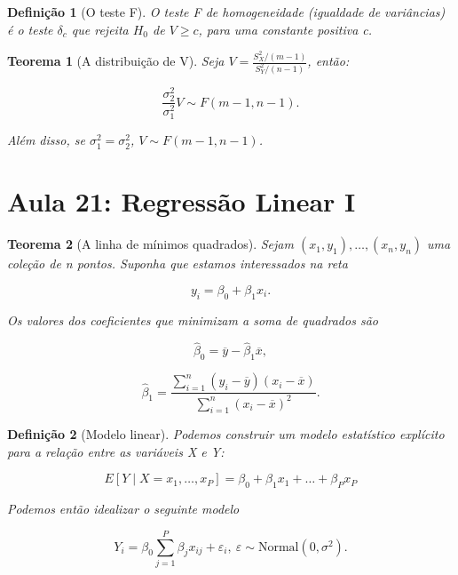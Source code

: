 \documentclass{article}
\newtheorem{theorem}{Teorema}
\newtheorem{definition}{Definição}
\begin{document}
\begin{definition}[O teste F]
O teste F de homogeneidade (igualdade de variâncias) é o teste $\delta_c$ que rejeita $H_0$ de $V \geq c$, para uma constante positiva c.
\end{definition}

\begin{theorem}[A distribuição de V]
Seja $V = \frac{S_X^2 / (m - 1)}{S_Y^2 / (n - 1)}$, então:

$$\frac{\sigma_2^2}{\sigma_1^2} V \sim F(m - 1, n - 1).$$

Além disso, se $\sigma_1^2 = \sigma_2^2$, $V \sim F(m - 1, n - 1)$.
\end{theorem}

\section*{Aula 21: Regressão Linear I}\label{s21}
\begin{theorem}[A linha de mínimos quadrados]
Sejam $(x_1, y_1), \ldots, (x_n, y_n)$ uma coleção de n pontos. Suponha que estamos interessados na reta

\begin{equation}
    y_i = \beta_0 + \beta_1 x_i.
\end{equation}

Os valores dos coeficientes que minimizam a  soma de quadrados são

$$\hat{\beta}_0 = \overline{y} - \hat{\beta}_1 \overline{x},$$

$$\hat{\beta}_1 = \frac{\sum_{i = 1}^n (y_i - \overline{y}) (x_i - \overline{x})}{\sum_{i = 1}^n (x_i - \overline{x})^2}.$$
\end{theorem}

\begin{definition}[Modelo linear]
Podemos construir um modelo estatístico explícito para a relação entre as variáveis X e Y:

\begin{equation}
    E[Y \mid X = x_1, \ldots, x_P] = \beta_0 + \beta_1 x_1 + \ldots + \beta_P x_P
\end{equation}

Podemos então idealizar o seguinte modelo

$$Y_i = \beta_0 \sum_{j = 1}^P \beta_j x_{ij} + \varepsilon_i, \ \varepsilon \sim \mathrm{Normal}(0, \sigma^2).$$
\end{definition}
\end{document}
